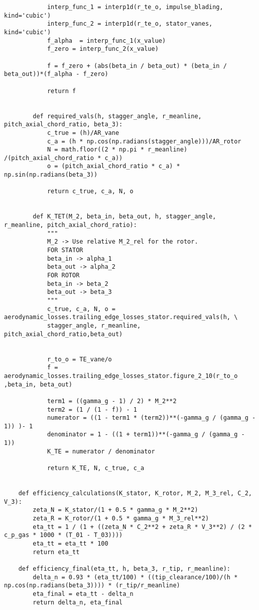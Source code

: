\begin{verbatim}
            interp_func_1 = interp1d(r_te_o, impulse_blading, kind='cubic')
            interp_func_2 = interp1d(r_te_o, stator_vanes, kind='cubic')
            f_alpha  = interp_func_1(x_value)
            f_zero = interp_func_2(x_value)

            f = f_zero + (abs(beta_in / beta_out) * (beta_in / beta_out))*(f_alpha - f_zero)

            return f
        

        def required_vals(h, stagger_angle, r_meanline, pitch_axial_chord_ratio, beta_3):
            c_true = (h)/AR_vane
            c_a = (h * np.cos(np.radians(stagger_angle)))/AR_rotor
            N = math.floor((2 * np.pi * r_meanline) /(pitch_axial_chord_ratio * c_a))
            o = (pitch_axial_chord_ratio * c_a) * np.sin(np.radians(beta_3))

            return c_true, c_a, N, o
            

        def K_TET(M_2, beta_in, beta_out, h, stagger_angle, r_meanline, pitch_axial_chord_ratio):
            """
            M_2 -> Use relative M_2_rel for the rotor.
            FOR STATOR
            beta_in -> alpha_1
            beta_out -> alpha_2
            FOR ROTOR
            beta_in -> beta_2
            beta_out -> beta_3
            """
            c_true, c_a, N, o = aerodynamic_losses.trailing_edge_losses_stator.required_vals(h, \
            stagger_angle, r_meanline, pitch_axial_chord_ratio,beta_out)


            r_to_o = TE_vane/o
            f = aerodynamic_losses.trailing_edge_losses_stator.figure_2_10(r_to_o ,beta_in, beta_out)
            
            term1 = ((gamma_g - 1) / 2) * M_2**2
            term2 = (1 / (1 - f)) - 1
            numerator = ((1 - term1 * (term2))**(-gamma_g / (gamma_g - 1)) )- 1
            denominator = 1 - ((1 + term1))**(-gamma_g / (gamma_g - 1))
            K_TE = numerator / denominator
            
            return K_TE, N, c_true, c_a

    
    def efficiency_calculations(K_stator, K_rotor, M_2, M_3_rel, C_2, V_3):
        zeta_N = K_stator/(1 + 0.5 * gamma_g * M_2**2)
        zeta_R = K_rotor/(1 + 0.5 * gamma_g * M_3_rel**2)
        eta_tt = 1 / (1 + ((zeta_N * C_2**2 + zeta_R * V_3**2) / (2 * c_p_gas * 1000 * (T_01 - T_03))))
        eta_tt = eta_tt * 100
        return eta_tt

    def efficiency_final(eta_tt, h, beta_3, r_tip, r_meanline):
        delta_n = 0.93 * (eta_tt/100) * ((tip_clearance/100)/(h * np.cos(np.radians(beta_3)))) * (r_tip/r_meanline)
        eta_final = eta_tt - delta_n
        return delta_n, eta_final
    

\end{verbatim}
